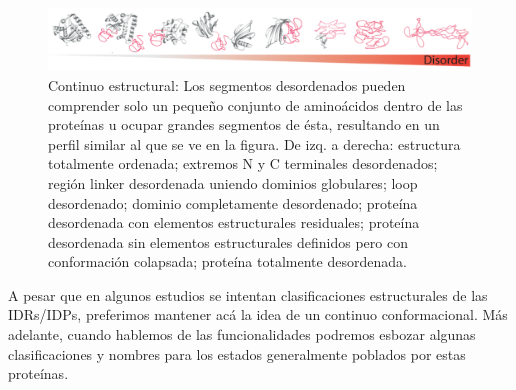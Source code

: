 \begin{figure}[htbp]
\centering
\includegraphics[width=1.0\textwidth]{img/conformationContinuum.png} 
\caption{ Continuo estructural: Los segmentos desordenados pueden comprender solo un pequeño conjunto de aminoácidos dentro de las proteínas u ocupar grandes segmentos de ésta, resultando en un
perfil similar al que se ve en la figura. De izq. a derecha: estructura totalmente ordenada; extremos N y C terminales desordenados; región linker desordenada uniendo dominios globulares; loop desordenado;
dominio completamente desordenado; proteína desordenada con elementos estructurales residuales; proteína desordenada sin elementos estructurales definidos pero con conformación colapsada; proteína totalmente desordenada.
}
\label{conformationContinuum}
\end{figure}


A pesar que en algunos estudios se intentan clasificaciones estructurales de las IDRs/IDPs, preferimos mantener acá la idea de un continuo conformacional.
Más adelante, cuando hablemos de las funcionalidades podremos esbozar algunas clasificaciones y nombres para los estados generalmente poblados por estas proteínas. 


